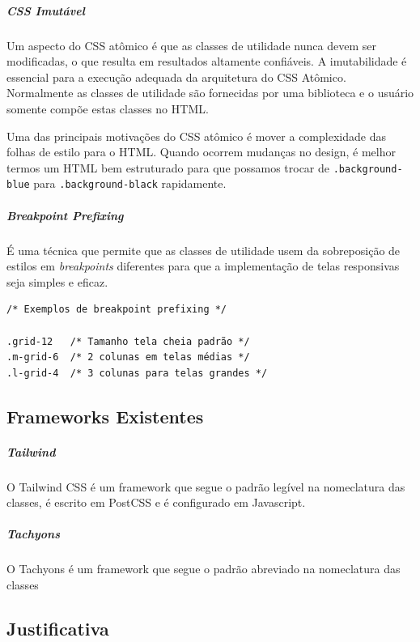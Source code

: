 \hypertarget{css-imutuxe1vel}{%
\subparagraph{CSS Imutável}\label{css-imutuxe1vel}}

Um aspecto do CSS atômico é que as classes de utilidade nunca devem ser
modificadas, o que resulta em resultados altamente confiáveis. A
imutabilidade é essencial para a execução adequada da arquitetura do CSS
Atômico. Normalmente as classes de utilidade são fornecidas por uma
biblioteca e o usuário somente compõe estas classes no HTML.

Uma das principais motivações do CSS atômico é mover a complexidade das
folhas de estilo para o HTML. Quando ocorrem mudanças no design, é
melhor termos um HTML bem estruturado para que possamos trocar de
\texttt{.background-blue} para \texttt{.background-black}
rapidamente.

\hypertarget{breakpoint-prefixing}{%
\subparagraph{Breakpoint Prefixing}\label{breakpoint-prefixing}}

É uma técnica que permite que as classes de utilidade usem da
sobreposição de estilos em \emph{breakpoints} diferentes para que a
implementação de telas responsivas seja simples e eficaz.

\begin{verbatim}
/* Exemplos de breakpoint prefixing */

.grid-12   /* Tamanho tela cheia padrão */
.m-grid-6  /* 2 colunas em telas médias */
.l-grid-4  /* 3 colunas para telas grandes */
\end{verbatim}

\hypertarget{frameworksexistentes}{%
\subsection{Frameworks Existentes}\label{frameworksexistentes}}

\hypertarget{tailwind}{%
\subparagraph{Tailwind}\label{tailwind}}

O Tailwind CSS é um framework que segue o padrão legível na nomeclatura das classes, é escrito em PostCSS e é configurado em Javascript.

\hypertarget{tachyons}{%
\subparagraph{Tachyons}\label{tachyons}}

O Tachyons é um framework que segue o padrão abreviado na nomeclatura das classes

\hypertarget{justificativa}{%
\subsection{Justificativa}\label{justificativa}}


